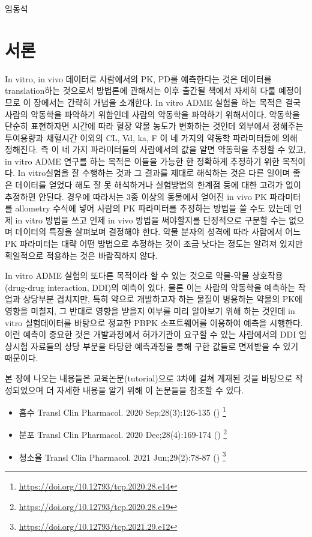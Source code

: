 \documentclass[
  11pt,
  krantz2, a4paper, twoside]{krantz}
\providecommand{\tightlist}{%
  \setlength{\itemsep}{0pt}\setlength{\parskip}{0pt}}
\begin{document}
\Large\hfill

임동석
\normalsize

\section{서론}\label{uxc11cuxb860-7}

In vitro, in vivo 데이터로 사람에서의 PK, PD를 예측한다는 것은 데이터를 translation하는 것으로서 방법론에 관해서는 이후 출간될 책에서 자세히 다룰 예정이므로 이 장에서는 간략히 개념을 소개한다.
In vitro ADME 실험을 하는 목적은 결국 사람의 약동학을 파악하기 위함인데 사람의 약동학을 파악하기 위해서이다.
약동학을 단순히 표현하자면 시간에 따라 혈장 약물 농도가 변화하는 것인데 외부에서 정해주는 투여용량과 채혈시간 이외의 CL, Vd, ka, F 이 네 가지의 약동학 파라미터들에 의해 정해진다.
즉 이 네 가지 파라미터들의 사람에서의 값을 알면 약동학을 추정할 수 있고, in vitro ADME 연구를 하는 목적은 이들을 가능한 한 정확하게 추정하기 위한 목적이다.
In vitro실험을 잘 수행하는 것과 그 결과를 제대로 해석하는 것은 다른 일이며 좋은 데이터를 얻었다 해도 잘 못 해석하거나 실험방법의 한계점 등에 대한 고려가 없이 추정하면 안된다.
경우에 따라서는 3종 이상의 동물에서 얻어진 in vivo PK 파라미터를 allometry 수식에 넣어 사람의 PK 파라미터를 추정하는 방법을 쓸 수도 있는데 언제 in vitro 방법을 쓰고 언제 in vivo 방법을 써야할지를 단정적으로 구분할 수는 없으며 데이터의 특징을 살펴보며 결정해야 한다.
약물 분자의 성격에 따라 사람에서 어느 PK 파라미터는 대략 어떤 방법으로 추정하는 것이 조금 낫다는 정도는 알려져 있지만 획일적으로 적용하는 것은 바람직하지 않다.

In vitro ADME 실험의 또다른 목적이라 할 수 있는 것으로 약물-약물 상호작용 (drug-drug interaction, DDI)의 예측이 있다.
물론 이는 사람의 약동학을 예측하는 작업과 상당부분 겹치지만, 특히 약으로 개발하고자 하는 물질이 병용하는 약물의 PK에 영향을 미칠지, 그 반대로 영향을 받을지 여부를 미리 알아보기 위해 하는 것인데 in vitro 실험데이터를 바탕으로 정교한 PBPK 소프트웨어를 이용하여 예측을 시행한다.
이런 예측이 중요한 것은 개발과정에서 허가기관이 요구할 수 있는 사람에서의 DDI 임상시험 자료들의 상당 부분을 타당한 예측과정을 통해 구한 값들로 면제받을 수 있기 때문이다.

본 장에 나오는 내용들은 교육논문(tutorial)으로 3차에 걸쳐 게재된 것을 바탕으로 작성되었으며 더 자세한 내용을 알기 위해 이 논문들을 참조할 수 있다.

\begin{itemize}
\tightlist
\item
  흡수 Transl Clin Pharmacol. 2020 Sep;28(3):126-135 () \footnote{\url{https://doi.org/10.12793/tcp.2020.28.e14}}
\item
  분포 Transl Clin Pharmacol. 2020 Dec;28(4):169-174 () \footnote{\url{https://doi.org/10.12793/tcp.2020.28.e19}}
\item
  청소율 Transl Clin Pharmacol. 2021 Jun;29(2):78-87 () \footnote{\url{https://doi.org/10.12793/tcp.2021.29.e12}}
\end{itemize}
\end{document}

